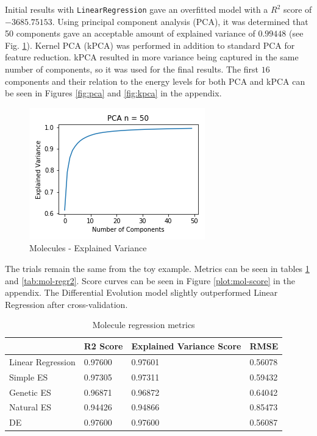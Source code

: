 \documentclass[conference]{IEEEtran}
\begin{document}
Initial results with \texttt{LinearRegression} gave an overfitted model with a $R^2$ score of $-3685.75153$. Using principal component analysis (PCA), 
it was determined that 50 components gave an acceptable amount of explained variance of $0.99448$ (see Fig. \ref{fig:exp}). Kernel PCA (kPCA) was 
performed in addition to standard PCA for feature reduction. kPCA resulted in more variance being captured in the same number of components, so it was 
used for the final results. The first $16$ components and their relation to the energy levels for both PCA and kPCA can be seen in Figures \ref{fig:pca} 
and \ref{fig:kpca} in the appendix.
\begin{figure}[htbp]
\centering
\includegraphics[width=.4\textwidth]{Molecules-ExplainedVariance.png}
\caption{Molecules - Explained Variance}
\label{fig:exp}
\end{figure}

The trials remain the same from the toy example. Metrics can be seen in tables \ref{tab:mol-regr1} and \ref{tab:mol-regr2}. Score curves can be seen 
in Figure \ref{plot:mol-score} in the appendix. The Differential Evolution model slightly outperformed Linear Regression after cross-validation.

\begin{table}[htbp]
\centering
\begin{tabular}{@{}llll@{}}
\toprule
 & R2 Score & Explained Variance Score & RMSE \\ \midrule
Linear Regression & \cellcolor[HTML]{C0C0C0}0.97600 & \cellcolor[HTML]{C0C0C0}0.97601 & \cellcolor[HTML]{C0C0C0}0.56078 \\
Simple ES & 0.97305 & 0.97311 & 0.59432 \\
Genetic ES & 0.96871 & 0.96872 & 0.64042 \\
Natural ES & 0.94426 & 0.94866 & 0.85473 \\
DE & \cellcolor[HTML]{C0C0C0}0.97600 & 0.97600 & 0.56087 \\ \bottomrule
\end{tabular}
\caption{Molecule regression metrics}
\label{tab:mol-regr1}
\end{table}
\end{document}
